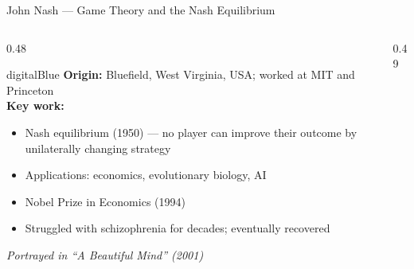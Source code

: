 \begin{frame}[shrink=11]{John Nash --- Game Theory and the Nash Equilibrium}

  \begin{columns}[T]
    \begin{column}{0.48\textwidth}
      \begin{personbox}{digitalBlue}
        \textbf{Origin:} Bluefield, West Virginia, USA; worked at MIT
        and Princeton\\[3pt]
        \textbf{Key work:}
        \begin{itemize}\setlength\itemsep{2pt}
          \item \alert{Nash equilibrium} (1950) --- no player can improve
                their outcome by unilaterally changing strategy
          \item Applications: economics, evolutionary biology, AI
          \item Nobel Prize in Economics (1994)
          \item Struggled with schizophrenia for decades; eventually recovered
        \end{itemize}
      \end{personbox}

      \vspace{0.3em}
      {\small\itshape Portrayed in ``A Beautiful Mind'' (2001)}
    \end{column}

    \begin{column}{0.49\textwidth}
    \end{column}
  \end{columns}

\end{frame}
